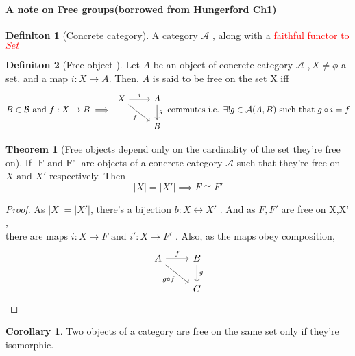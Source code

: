 \documentclass{article}
\theoremstyle{definition}
\theoremstyle{definition}
\newtheorem{definition}{Definiton}[section]
\newtheorem{theorem}{Theorem}[section]
\newtheorem{corollary}{Corollary}[theorem]
\begin{document}
\paragraph{A note on Free groups(borrowed from Hungerford Ch1)}
\begin{definition}[Concrete category] %
	A category $ \mathcal{A}  $ , along with a \textcolor{red}{ faithful functor to $ Set $ }
\end{definition}

\begin{definition}[Free object ] %
Let $ A $ be an object of concrete category $ \mathcal{A}  $ ,$ \, X \neq \phi $ a set, and a map $ i:X \rightarrow A $. Then, $ A $ is said to be free on the set X iff
\begin{equation*}
B\in \mathcal{B} \text{ and }f:X\rightarrow B\implies
\begin{tikzcd}
	X \arrow{r}{i} \arrow [swap]{dr}{f} & A \arrow{d}{g} \\ & B
\end{tikzcd}
\text{ commutes i.e. }\exists! g \in \mathcal{A}(A,B)\text{ such that } g \circ i = f
\end{equation*}




\end{definition}

\begin{theorem}[Free objects depend only on the cardinality of the set they're free on] %
	If $ \text{ F and F' }$ are objects of a concrete category $ \mathcal{A} $ such that they're free on $ X \text{ and } X' $ respectively. Then
	\[ |X|=|X'| \implies F \cong F'\]
\end{theorem}
\begin{proof}


As $ |X|=|X'| $, there's a bijection $ b: X\longleftrightarrow X' $ . And as $ F,F' $ are free on X,X' , \\
there are maps $ i:X \rightarrow F \text{ and } i':X \rightarrow F' $ . Also, as the maps obey composition,
\[
\begin{tikzcd}
	A \arrow{r}{f} \arrow[swap]{dr}{g \circ f} & B \arrow{d}{g} \\
						   & C
\end{tikzcd}
 \]

\end{proof}
\begin{corollary}
	Two objects of a category are free on the same set only if they're isomorphic.
\end{corollary}
\end{document}
